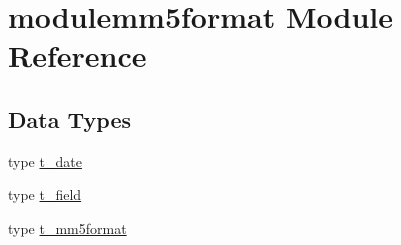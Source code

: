 \hypertarget{namespacemodulemm5format}{}\section{modulemm5format Module Reference}
\label{namespacemodulemm5format}
\subsection*{Data Types}
\begin{DoxyCompactItemize}
\item 
type \mbox{\hyperlink{structmodulemm5format_1_1t__date}{t\+\_\+date}}
\item 
type \mbox{\hyperlink{structmodulemm5format_1_1t__field}{t\+\_\+field}}
\item 
type \mbox{\hyperlink{structmodulemm5format_1_1t__mm5format}{t\+\_\+mm5format}}
\end{DoxyCompactItemize}
